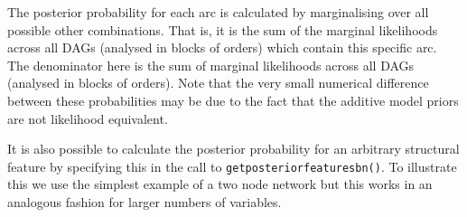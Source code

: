 \documentclass[nojss]{jss}
\begin{document}
The posterior probability for each arc is calculated by marginalising over all possible other combinations. That is, it is the sum of the marginal likelihoods across all DAGs (analysed in blocks of orders) which contain this specific arc. The denominator here is the sum of marginal likelihoods across all DAGs (analysed in blocks of orders). Note that the very small numerical difference between these probabilities may be due to the fact that the additive model priors are not likelihood equivalent.

It is also possible to calculate the posterior probability for an arbitrary structural feature by specifying this in the call to {\tt getposteriorfeaturesbn()}. To illustrate this we use the simplest example of a two node network but this works in an analogous fashion for larger numbers of variables.   
\end{document}
